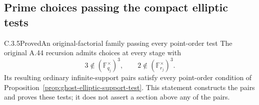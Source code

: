 \subsection{Prime choices passing the compact elliptic tests}
\label{sec:ghost-elliptic-survival}

\begin{result}{C.3.5}{Proved}{An original-factorial family passing every point-order test}
\label{prop:ghost-elliptic-passing}
The original A.44 recursion admits choices at every stage with
\[
 3\notin(\mathbb F_{q_j}^{\times})^3,
       \qquad 2\notin(\mathbb F_{r_j}^{\times})^3.
                                                        \tag{21}
\]
Its resulting ordinary infinite-support pairs satisfy every
point-order condition of
Proposition~\ref{prop:ghost-elliptic-support-test}.
This statement constructs the pairs and proves these tests;
it does not assert a section above any of the pairs.
\end{result}
